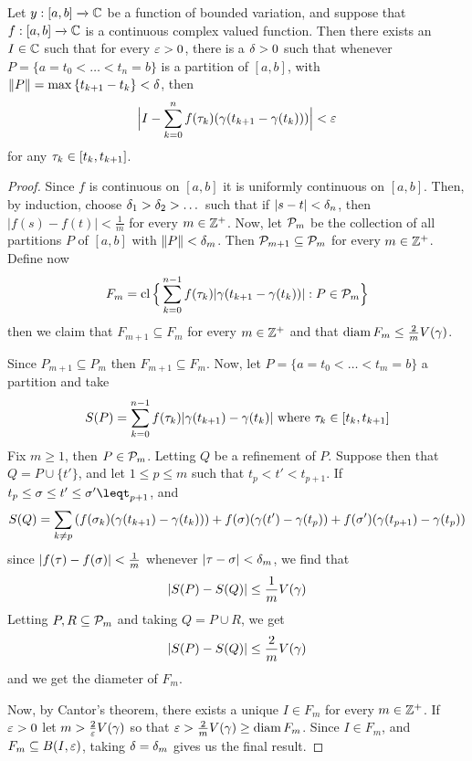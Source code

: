 \begin{theorem}\label{4.1.6}
    Let $y:[a,b] \xrightarrow{} \mathbb{C}$ be a function of bounded variation, and
    suppose that $f:[a,b] \xrightarrow{} \mathbb{C}$ is a continuous complex valued
    function. Then there exists an $I \in \mathbb{C}$ such that for every $\varepsilon>0$, there
    is a $\delta>0$ such that whenever  $P=\{a=t_0<\dots<t_n=b\}$ is a partition of
    $[a,b]$, with $\|P\|=\max{\{t_{k+1}-t_k\}}<\delta$, then
    \begin{equation*}
        \Big{|} I-\sum_{k=0}^n{f(\tau_k)(\gamma(t_{k+1}-\gamma(t_k)))} \Big{|}<\varepsilon
    \end{equation*}
    for any $\tau_k \in [t_k,t_{k+1}]$.
\end{theorem}
\begin{proof}
    Since $f$ is continuous on  $[a,b]$ it is uniformly continuous on $[a,b]$.
    Then, by induction, choose $\delta_1>\delta_2>\dots$ such that if $|s-t|<\delta_n$, then
     $|f(s)-f(t)|<\frac{1}{m}$ for every $m \in \mathbb{Z}^+$. Now, let  $\mathcal{P}_m$ be the
     collection of all partitions $P$ of $[a,b]$ with $\|P\|<\delta_m$. Then
     $\mathcal{P}_{m+1} \subseteq \mathcal{P}_m$ for every $m \in \mathbb{Z}^+$. Define now
      \begin{equation*}
          F_m=\operatorname{cl}{\Big{\{}\sum_{k=0}^{n-1}{f(\tau_k)|\gamma(t_{k+1}-\gamma(t_k))|} :
          P \in \mathcal{P}_m\Big{\}}}
      \end{equation*}
      then we claim that $F_{m+1} \subseteq F_m$ for every $m \in \mathbb{Z}^+$ and that
      $\operatorname{diam}{F_m} \leq \frac{2}{m}V(\gamma)$.

      Since $P_{m+1} \subseteq P_m$ then $F_{m+1} \subseteq F_m$. Now, let
      $P=\{a= t_0<\dots<t_m=b\}$ a partition and take
      \begin{equation*}
          S(P)=\sum_{k=0}^{n-1}{f(\tau_k)|\gamma(t_{k+1})-\gamma(t_k)|} \text{ where }
          \tau_k \in [t_k,t_{k+1}]
      \end{equation*}
      Fix $m \geq 1$, then  $P \in \mathcal{P}_m$. Letting  $Q$ be a refinement of  $P$.
      Suppose then that $Q=P \cup \{t'\}$, and let $1 \leq p \leq m$ such that
      $t_p<t'<t_{p+1}$. If  $t_p \leq \s
      \leq t' \leq \s' \leqt_{p+1}$, and
      \begin{equation*}
          S(Q)=\sum_{k \neq p}{(f(\sigma_k)(\gamma(t_{k+1})-\gamma(t_k)))}+
          f(\sigma)(\gamma(t')-\gamma(t_p))+f(\sigma')(\gamma(t_{p+1})-\gamma(t_p))
      \end{equation*}
      since $|f(\tau)-f(\sigma)|<\frac{1}{m}$ whenever $|\tau-\sigma|<\delta_m$, we find that
       \begin{equation*}
           |S(P)-S(Q)| \leq \frac{1}{m}V(\gamma)
      \end{equation*}
      Letting $P,R \subseteq \mathcal{P}_m$ and taking  $Q=P \cup R$, we get
      \begin{equation*}
          |S(P)-S(Q)| \leq \frac{2}{m}V(\gamma)
      \end{equation*}
      and we get the diameter of $F_m$.

      Now, by Cantor's theorem, there exists a unique  $I \in F_m$ for every
      $m \in \mathbb{Z}^+$. If  $\varepsilon>0$ let  $m>\frac{2}{\varepsilon}V(\gamma)$ so that
      $\varepsilon>\frac{2}{m}V(\gamma) \geq \operatorname{diam}{F_m}$. Since $I \in F_m$, and $F_m
      \subseteq B(I,\varepsilon)$, taking $\delta=\delta_m$ gives us the final result.
\end{proof}

